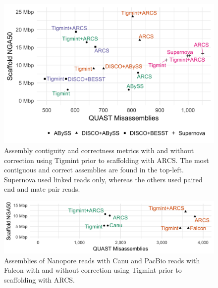 \documentclass{bmcart}
\begin{document}
\begin{figure}[h!t]
\hypertarget{fig:metrics}{%
\centering
\includegraphics[width=4.8in]{figures/metrics.png}
\caption{Assembly contiguity and correctness metrics with and without correction using Tigmint prior to scaffolding with ARCS. The most contiguous and correct assemblies are found in the top-left. Supernova used linked reads only, whereas the others used paired end and mate pair reads.}\label{fig:metrics}
}
\end{figure}

\begin{figure}[h!t]
\hypertarget{fig:metrics-sms}{%
\centering
\includegraphics[width=4.8in]{figures/metrics-sms.png}
\caption{Assemblies of Nanopore reads with Canu and PacBio reads with Falcon with and without correction using Tigmint prior to scaffolding with ARCS.}\label{fig:metrics-sms}
}
\end{figure}
\end{document}
